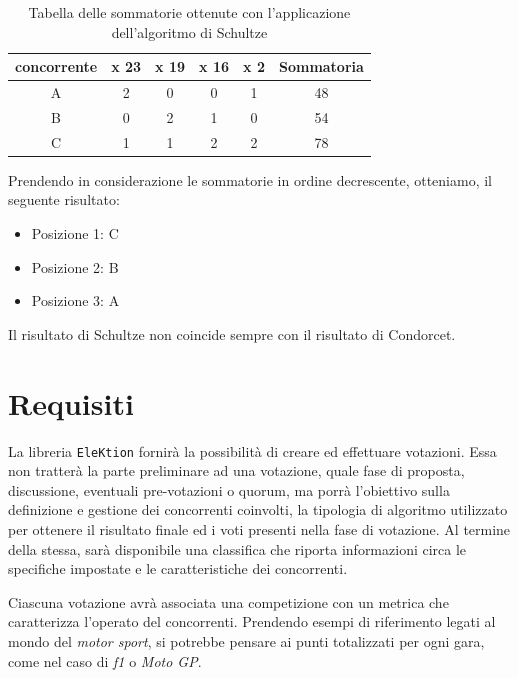 \documentclass[12pt,a4paper,openright,twoside]{book}
\begin{document}
\begin{table}[H]
    \centering
    \begin{tabular}{|c|c|c|c|c|c|}
    \hline
    \multicolumn{1}{|l|}{concorrente} & \multicolumn{1}{|l|}{x 23} & \multicolumn{1}{|l|}{x 19} & \multicolumn{1}{l|}{x 16} & \multicolumn{1}{l|}{x 2} & \multicolumn{1}{l|}{Sommatoria} \\ \hline
    A & 2 & 0 & 0 & 1 & 48                              \\ \hline
    B & 0 & 2 & 1 & 0 & 54                              \\ \hline
    C & 1 & 1 & 2 & 2 & 78                             \\ \hline
  
    \end{tabular}
    \caption{Tabella delle sommatorie ottenute con l'applicazione dell'algoritmo di Schultze}
    \label{table:risultatischultze}
\end{table}

Prendendo in considerazione le sommatorie in ordine decrescente, otteniamo, il seguente risultato:
\begin{itemize}
    \item{Posizione 1: C}
    \item{Posizione 2: B}
    \item{Posizione 3: A}
\end{itemize} 

Il risultato di Schultze non coincide sempre con il risultato di Condorcet.

\newpage
\section{Requisiti}
La libreria \texttt{EleKtion} fornirà la possibilità di creare ed effettuare votazioni.
Essa non tratterà la parte preliminare ad una votazione, quale fase di proposta, discussione,
eventuali pre-votazioni o quorum, ma porrà l'obiettivo sulla definizione e gestione dei concorrenti coinvolti,
la tipologia di algoritmo utilizzato per ottenere il risultato finale ed i voti presenti nella fase di votazione.
Al termine della stessa, sarà disponibile una classifica che riporta informazioni 
circa le specifiche impostate e le caratteristiche dei concorrenti.


Ciascuna votazione avrà associata una competizione con un metrica che caratterizza l'operato del concorrenti.
Prendendo esempi di riferimento legati al mondo del \textit{motor sport},
si potrebbe pensare ai punti totalizzati per ogni gara, come nel caso di \textit{\ac{f1}} o \textit{Moto GP}.
\end{document}
